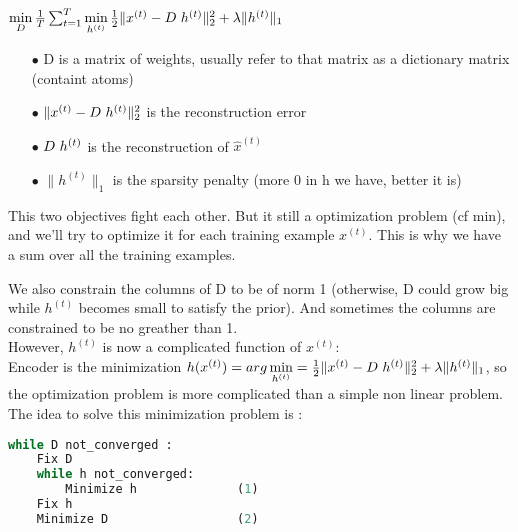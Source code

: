 \documentclass[a4paper,10pt]{article}
\begin{document}
\begin{center}
 $\min\limits_{D} \frac{1}{T} \sum_{t=1}^{T}  \min\limits_{h^{(t)}} \frac{1}{2} \| x^{(t)} - D \hspace{3px} h^{(t)} \|_2^2 + \lambda \|h^{(t)} \|_1$\\
\end{center}

 \begin{itemize}
 \item[$\bullet$] D is a matrix of weights, usually refer to that matrix as a dictionary matrix (containt atoms)
  \item[$\bullet$] $\| x^{(t)} - D \hspace{3px} h^{(t)} \|_2^2 $ is the reconstruction error
  \item[$\bullet$]$ D \hspace{3px} h^{(t)}$ is the reconstruction of $\hat{x}^{(t)}$
  \item[$\bullet$]$\|h^{(t)} \|_1$ is the sparsity penalty (more 0 in h we have, better it is)
 \end{itemize}
This two objectives fight each other. But it still a optimization problem (cf min), and we'll try to optimize it for each training example $x^{(t)}$. This is why we have a sum over all the training examples.
\newline

\indent We also constrain the columns of D to be of norm 1 (otherwise, D could grow big while $h^{(t)}$ becomes small to satisfy the prior). And sometimes the columns are constrained to be no greather than 1.\\

However, $h^{(t)}$ is now a complicated function of $x^{(t)}$:\\
Encoder is the minimization $h(x^{(t)}) = arg\min\limits_{h^{(t)}}= \frac{1}{2} \| x^{(t)} - D \hspace{3px} h^{(t)} \|_2^2 + \lambda \|h^{(t)} \|_1$, so the optimization problem is more complicated than a simple non linear problem.\\
The idea to solve this minimization problem is \cite{NIPS2006_2979} :

\begin{lstlisting}[language=Python,frame=single]
while D not_converged :
    Fix D
    while h not_converged:
        Minimize h              (1)
    Fix h 
    Minimize D                  (2)
\end{lstlisting}
\end{document}
